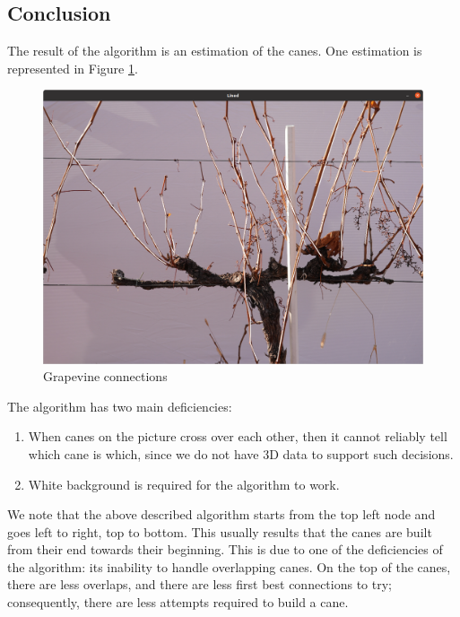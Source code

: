 \documentclass{PSAIE}%
\begin{document}
\subsection{Conclusion} \label{sec_build_cane_conclusion}
The result of the algorithm is an estimation of the canes. One estimation is represented in Figure
\ref{fig_grapevine_connections}.

\begin{figure}[h]
      \centering
      \includegraphics[scale=0.28]{images/grapevine_connections.png}
      \caption{Grapevine connections}
      \label{fig_grapevine_connections}
\end{figure}

The algorithm has two main deficiencies:
\begin{enumerate}
      \item When canes on the picture cross over each other, then it cannot reliably tell which cane is which, since
            we do not have 3D data to support such decisions.
      \item White background is required for the algorithm to work.
\end{enumerate}

We note that the above described algorithm starts from the top left node and goes left to right, top to bottom.
This usually results that the canes are built from their end towards their beginning. This is due to one of the
deficiencies of the algorithm: its inability to handle overlapping canes. On the top of the canes, there are
less overlaps, and there are less first best connections to try; consequently, there are less attempts required to
build a cane.
\end{document}

